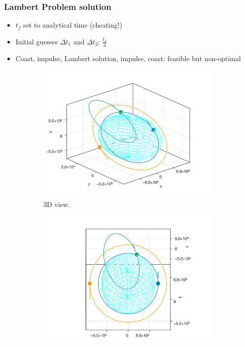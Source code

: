 \documentclass{beamer}
\begin{document}
\begin{frame}
    \frametitle{Lambert Problem solution}
    \begin{itemize}
        \item \(t_f\) set to analytical time (cheating!)
        \item Initial guesses \(\Delta t_1\) and \(\Delta t_2\): \(\frac{t_f}{3}\)
        \item Coast, impulse, Lambert solution, impulse, coast: feasible but non-optimal
    \end{itemize}
    
    \begin{figure}[htbp]
        \centering
        \begin{subfigure}{0.49\textwidth}
            \includegraphics[width=\textwidth]{../report/img/hohmann_lambert_guess.png}
            \caption{3D view.}
        \end{subfigure}
        \begin{subfigure}{0.49\textwidth}
            \includegraphics[width=\textwidth]{../report/img/hohmann_lambert_guess_in_plane.png}

\end{subfigure}
\end{figure}
\end{frame}
\end{document}
